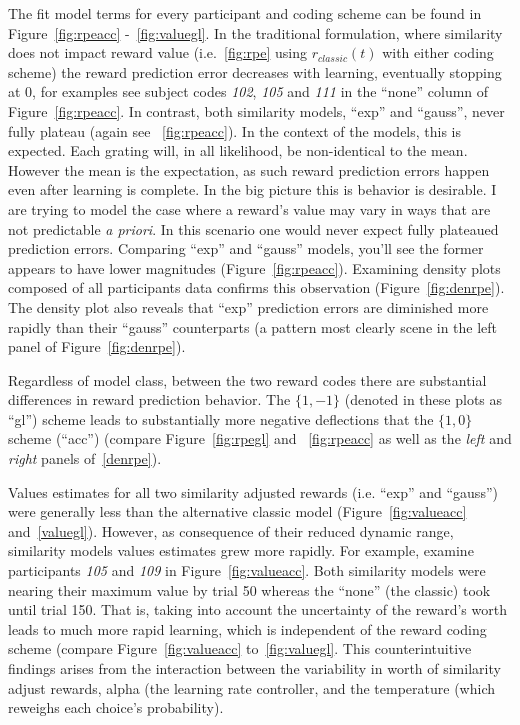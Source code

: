 \documentclass[doc,12pt]{apa}        %
\begin{document}
The fit model terms for every participant and coding scheme can be found in Figure~\ref{fig:rpeacc} -~\ref{fig:valuegl}.  In the traditional formulation, where similarity does not impact reward value (i.e.~\ref{fig:rpe} using $r_{classic}(t)$ with either coding scheme) the reward prediction error decreases with learning, eventually stopping at 0, for examples see subject codes \emph{102}, \emph{105} and \emph{111} in the ``none'' column of Figure~\ref{fig:rpeacc}.  In contrast, both similarity models, ``exp'' and ``gauss'', never fully plateau (again see ~\ref{fig:rpeacc}).  In the context of the models, this is expected.  Each grating will, in all likelihood, be non-identical to the mean. However the mean is the expectation, as such reward prediction errors happen even after learning is complete.  In the big picture this is behavior is desirable.  I are trying to model the case where a reward's value may vary in ways that are not predictable \emph{a priori}.  In this scenario one would never expect fully plateaued prediction errors.  Comparing ``exp'' and ``gauss'' models, you'll see the former appears to have lower magnitudes (Figure~\ref{fig:rpeacc}).  Examining density plots composed of all participants data confirms this observation (Figure~\ref{fig:denrpe}).  The density plot also reveals that ``exp'' prediction errors are diminished more rapidly than their ``gauss'' counterparts (a pattern most clearly scene in the left panel of Figure~\ref{fig:denrpe}).

Regardless of model class, between the two reward codes there are substantial differences in reward prediction behavior.  The $\{1,-1\}$ (denoted in these plots as ``gl'') scheme leads to substantially more negative deflections that the $\{1,0\}$ scheme (``acc'') (compare Figure~\ref{fig:rpegl} and ~\ref{fig:rpeacc} as well as the \emph{left} and \emph{right} panels of~\ref{denrpe}).   

Values estimates for all two similarity adjusted rewards (i.e. ``exp'' and ``gauss'') were generally less than the alternative classic model (Figure~\ref{fig:valueacc} and~\ref{valuegl}).  However, as consequence of their reduced dynamic range, similarity models values estimates grew more rapidly.  For example, examine participants \emph{105} and \emph{109} in Figure~\ref{fig:valueacc}.  Both similarity models were nearing their maximum value by trial 50 whereas the ``none'' (the classic) took until trial 150.  That is, taking into account the uncertainty of the reward's worth leads to much more rapid learning, which is independent of the reward coding scheme (compare  Figure~\ref{fig:valueacc} to~\ref{fig:valuegl}.  This counterintuitive findings arises from the interaction between the variability in worth of similarity adjust rewards, alpha (the learning rate controller, and the temperature (which reweighs each choice's probability).  
\end{document}
